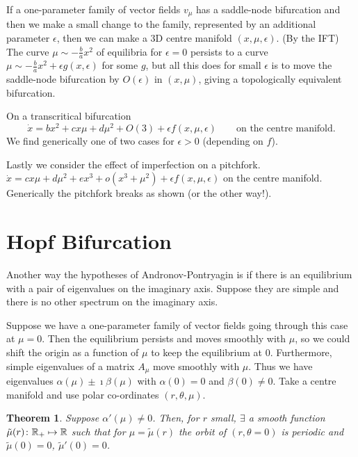 \documentclass{notes}
\theoremstyle{plain}
\newtheorem*{theorem}{Theorem}
\begin{document}
If a one-parameter family of vector fields $v_\mu$ has a saddle-node
bifurcation and then we make a small change to the family, represented
by an additional parameter $\epsilon$, then we can make a 3D centre manifold
$(x,\mu,\epsilon)$.  (By the IFT) The curve $\mu \sim -\frac{b}{a} x^2$ of
equilibria for $\epsilon = 0$ persists to a curve $\mu \sim -\frac{b}{a} x^2 +
\epsilon g(x,\epsilon)$ for some $g$, but all this does for small
$\epsilon$ is to move the saddle-node bifurcation by $O(\epsilon)$ in
$(x,\mu)$, giving a topologically equivalent bifurcation.
\vspace{1.5in}

On a transcritical bifurcation
\[
\dot{x} = b x^2 + c x \mu + d \mu^2 + O(3) + \epsilon f(x,\mu,\epsilon)
\qquad \text{on the centre manifold.}
\]
We find generically one of two cases for $\epsilon > 0$ (depending on
$f$).
\vspace{1.5in}

Lastly we consider the effect of imperfection on a pitchfork.
$\dot{x} = c x \mu + d \mu^2+ ex^3 + o(x^3 + \mu^2) + \epsilon
f(x,\mu,\epsilon)$ on the centre manifold.
Generically the pitchfork breaks as shown (or the other way!).

\section{Hopf Bifurcation}

Another way the hypotheses of Andronov-Pontryagin is if there is
an equilibrium with a pair of eigenvalues on the imaginary axis.  Suppose
they are simple and there is no other spectrum on the imaginary axis.

Suppose we have a one-parameter family of vector fields going through this
case at $\mu=0$.  Then the equilibrium persists and moves smoothly with
$\mu$, so we could shift the origin as a function of $\mu$ to keep the
equilibrium at $0$.  Furthermore, simple eigenvalues of a matrix
$A_\mu$ move smoothly with $\mu$.  Thus we have eigenvalues
$\alpha(\mu) \pm \imath \beta(\mu)$ with $\alpha(0) = 0$ and
$\beta(0) \neq 0$. Take a centre manifold and use polar co-ordinates
$(r,\theta,\mu)$.

\begin{theorem}
  Suppose $\alpha'(\mu) \neq 0$.  Then, for $r$ small, $\exists$ a
  smooth function $\tilde{\mu}(r) \colon \mathbb{R}_+ \mapsto \mathbb{R}$ such that
  for $\mu = \tilde{\mu}(r)$ the orbit of $(r,\theta=0)$ is periodic
  and $\tilde{\mu}(0) = 0$, $\tilde{\mu}'(0) = 0$.
\end{theorem}
\end{document}
